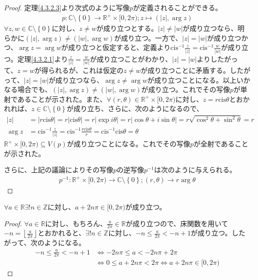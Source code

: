 \documentclass[dvipdfmx]{jsarticle}
\begin{document}
\begin{proof} 定理\ref{4.3.2.3}より次式のように写像$p$が定義されることができる。
\begin{align*}
p:\mathbb{C} \setminus \left\{ 0 \right\} \rightarrow \mathbb{R}^{+} \times [ 0,2\pi);z \mapsto \left( |z|,\arg z \right)
\end{align*}
$\forall z,w \in \mathbb{C} \setminus \left\{ 0 \right\}$に対し、$z \neq w$が成り立つとする。$|z| \neq |w|$が成り立つなら、明らかに$\left( |z|,\arg z \right) \neq \left( |w|,\arg w \right)$が成り立つ。一方で、$|z| = |w|$が成り立つかつ、$\arg z = \arg w$が成り立つと仮定すると、定義より${\mathrm{cis}}^{- 1}\frac{z}{|z|} = {\mathrm{cis}}^{- 1}\frac{w}{|w|}$が成り立つ。定理\ref{4.3.2.1}より$\frac{z}{|z|} = \frac{w}{|w|}$が成り立つことがわかり、$|z| = |w|$よりしたがって、$z = w$が得られるが、これは仮定の$z \neq w$が成り立つことに矛盾する。したがって、$|z| = |w|$が成り立つなら、$\arg z \neq \arg w$が成り立つことになる。以上いかなる場合でも、$\left( |z|,\arg z \right) \neq \left( |w|,\arg w \right)$が成り立つ。これでその写像$p$が単射であることが示された。また、$\forall(r,\theta) \in \mathbb{R}^{+} \times [ 0,2\pi)$に対し、$z = r{\mathrm{cis}}\theta$とおかれれば、$z \in \mathbb{C} \setminus \left\{ 0 \right\}$が成り立ち、さらに、次のようになるので、
\begin{align*}
|z| &= \left| r{\mathrm{cis}}\theta \right| = r\left| {\mathrm{cis}}\theta \right| = r\left| \exp{i\theta} \right| = r\left| \cos\theta + i\sin\theta \right| = r\sqrt{\cos^{2}\theta + \sin^{2}\theta} = r\\
\arg z &= {\mathrm{cis}}^{- 1}\frac{z}{|z|} = {\mathrm{cis}}^{- 1}\frac{r{\mathrm{cis}}\theta}{r} = {\mathrm{cis}}^{- 1}{{\mathrm{cis}}\theta} = \theta
\end{align*}
$\mathbb{R}^{+} \times [ 0,2\pi) \subseteq V(p)$が成り立つことになる。これでその写像$p$が全射であることが示された。\par
さらに、上記の議論によりその写像$p$の逆写像$p^{- 1}$は次のように与えられる。
\begin{align*}
p^{- 1}:\mathbb{R}^{+} \times [ 0,2\pi) \rightarrow \mathbb{C} \setminus \left\{ 0 \right\};(r,\theta) \rightarrow r\arg\theta
\end{align*}
\end{proof}
\begin{thm}\label{4.3.2.5}
$\forall a \in \mathbb{R}\exists!n \in \mathbb{Z}$に対し、$a + 2n\pi \in [ 0,2\pi)$が成り立つ。
\end{thm}
\begin{proof}
$\forall a \in \mathbb{R}$に対し、もちろん、$\frac{a}{2\pi} \in \mathbb{R}$が成り立つので、床関数を用いて$- n = \left\lfloor \frac{a}{2\pi} \right\rfloor$とおかれると、$\exists!n \in \mathbb{Z}$に対し、$- n \leq \frac{a}{2\pi} < - n + 1$が成り立つ。したがって、次のようになる。
\begin{align*}
- n \leq \frac{a}{2\pi} < - n + 1 &\Leftrightarrow - 2n\pi \leq a < - 2n\pi + 2\pi\\
&\Leftrightarrow 0 \leq a + 2n\pi < 2\pi \Leftrightarrow a + 2n\pi \in [ 0,2\pi)
\end{align*}
\end{proof}
\end{document}
